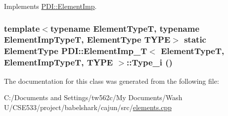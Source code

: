 Implements \hyperlink{class_p_d_i_1_1_element_imp_1ab2a2d2523b358077129413c4eddd15}{PDI::ElementImp}.\hypertarget{class_p_d_i_1_1_element_imp___t_2396ace1aa37ed1275db4e5b6983e1e3}{
\subsubsection[{Type\_\-i}]{\setlength{\rightskip}{0pt plus 5cm}template$<$typename ElementTypeT, typename ElementImpTypeT, ElementType TYPE$>$ static {\bf ElementType} {\bf PDI::ElementImp\_\-T}$<$ ElementTypeT, ElementImpTypeT, TYPE $>$::Type\_\-i ()}}
\label{class_p_d_i_1_1_element_imp___t_2396ace1aa37ed1275db4e5b6983e1e3}




The documentation for this class was generated from the following file:\begin{CompactItemize}
\item 
C:/Documents and Settings/tw562c/My Documents/Wash U/CSE533/project/babelshark/cajun/src/\hyperlink{elements_8cpp}{elements.cpp}\end{CompactItemize}
